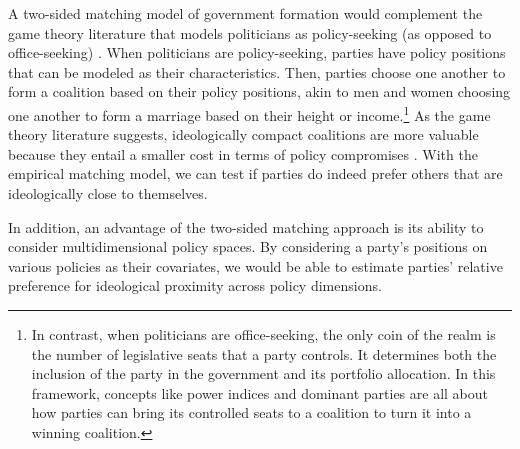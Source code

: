 A two-sided matching model of government formation would complement the game
theory literature that models politicians as policy-seeking (as opposed to
office-seeking) \citep{Laver1998}. When politicians are policy-seeking, parties
have policy positions that can be modeled as their characteristics. Then,
parties choose one another to form a coalition based on their policy positions,
akin to men and women choosing one another to form a marriage based on their
height or income.\footnote{In contrast, when politicians are office-seeking, the
  only coin of the realm is the number of legislative seats that a party
  controls. It determines both the inclusion of the party in the government and
  its portfolio allocation. In this framework, concepts like power indices and
  dominant parties are all about how parties can bring its controlled seats to a
  coalition to turn it into a winning coalition.} As the game theory literature
suggests, ideologically compact coalitions are more valuable because they entail
a smaller cost in terms of policy compromises \citep{DeSwaan1973}. With the empirical
matching model, we can test if parties do indeed prefer others that are
ideologically close to themselves.

In addition, an advantage of the two-sided matching approach is its ability to
consider multidimensional policy spaces. By considering a party's positions on
various policies as their covariates, we would be able to estimate parties'
relative preference for ideological proximity across policy dimensions.
